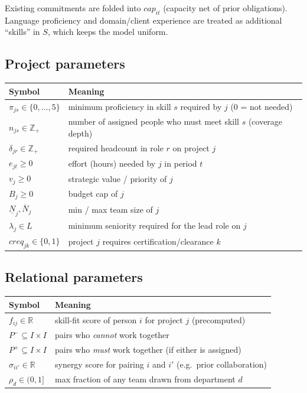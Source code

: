 \documentclass[11pt]{article}
\newcommand{\R}{\mathbb{R}}
\newcommand{\B}{\{0,1\}}
\theoremstyle{remark}
\begin{document}
Existing commitments are folded into $\mathit{cap}_{it}$ (capacity net of
prior obligations). Language proficiency and domain/client experience are
treated as additional ``skills'' in $S$, which keeps the model uniform.

\subsection{Project parameters}

\begin{center}
\begin{tabular}{ll}
\toprule
Symbol & Meaning \\
\midrule
$\pi_{js} \in \{0,\dots,5\}$ & minimum proficiency in skill $s$ required by $j$ ($0$ = not needed) \\
$n_{js} \in \mathbb{Z}_{+}$ & number of assigned people who must meet skill $s$ (coverage depth) \\
$\delta_{jr} \in \mathbb{Z}_{+}$ & required headcount in role $r$ on project $j$ \\
$e_{jt} \ge 0$ & effort (hours) needed by $j$ in period $t$ \\
$v_j \ge 0$ & strategic value / priority of $j$ \\
$B_j \ge 0$ & budget cap of $j$ \\
$\underline{N}_j, \overline{N}_j$ & min / max team size of $j$ \\
$\lambda_j \in L$ & minimum seniority required for the lead role on $j$ \\
$\mathit{creq}_{jk} \in \B$ & project $j$ requires certification/clearance $k$ \\
\bottomrule
\end{tabular}
\end{center}

\subsection{Relational parameters}

\begin{center}
\begin{tabular}{ll}
\toprule
Symbol & Meaning \\
\midrule
$f_{ij} \in \R$ & skill-fit score of person $i$ for project $j$ (precomputed) \\
$P^{-} \subseteq I \times I$ & pairs who \emph{cannot} work together \\
$P^{+} \subseteq I \times I$ & pairs who \emph{must} work together (if either is assigned) \\
$\sigma_{i i'} \in \R$ & synergy score for pairing $i$ and $i'$ (e.g.\ prior collaboration) \\
$\rho_d \in (0,1]$ & max fraction of any team drawn from department $d$ \\
\bottomrule
\end{tabular}
\end{center}
\end{document}
